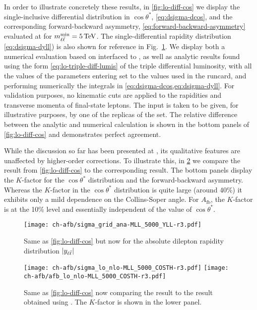 In order to illustrate concretely these results,  
in \cref{fig:lo-diff-cos} we display the
single-inclusive differential distribution in $\cos\theta^*$,
\cref{eq:dsigma-dcos},
and the corresponding forward-backward asymmetry,
\cref{eq:forward-backward-asymmetry} evaluated at \lo
for $\mll^{\text{min}}=\SI{5}{\TeV}$. The single-differential rapidity
distribution \cref{eq:dsigma-dyll}) is also shown for reference in Fig.~\ref{fig:lo-diff-yll}.
%
We display both a numerical evaluation based on \mgamc interfaced to \pineappl,
as well as analytic results found using the form \cref{eq:lo-triple-diff-lumis}
of the triple differential luminosity, with all the values of the parameters
entering  set to the values used in the \mgamc
runcard, and performing  numerically the integrals in
\cref{eq:dsigma-dcos,eq:dsigma-dyll}.
%
For validation purposes, no kinematic cuts are applied to the rapidities and
transverse momenta of final-state leptons.
The \pdf input is taken to be given, for illustrative purposes, by one of the
replicas of the  \nnlo set.
The relative difference between the analytic and numerical calculation is shown
in the bottom panels of \cref{fig:lo-diff-cos} and demonstrates perfect
agreement. 

While the discussion so far has been presented  at \lo, its qualitative
features are unaffected by  higher-order corrections.
%
To illustrate this, in \cref{fig:lo-kfact} we compare the \lo result  from
\cref{fig:lo-diff-cos} to the corresponding \nlo \qcd result.
%
The bottom panels display the \nlo $K$-factor for the $\cos\theta^*$
distribution and the forward-backward asymmetry.
%
Whereas the \nlo $K$-factor in the $\cos\theta^*$ distribution is quite large
(around 40\%) it exhibits only a mild dependence on the Collins-Soper angle.
%
For $A_{\text{fb}}$, the $K$-factor is at the 10\% level and essentially
independent of the value of $\cos\theta^*$.

\begin{figure}[t]
  \centering
  \texttt{[image: ch-afb/sigma\_grid\_ana-MLL\_5000\_YLL-r3.pdf]}
  \caption{Same as \cref{fig:lo-diff-cos} but now for the absolute dilepton rapidity distribution $|y_{\ell\bar{\ell}}|$}
  \label{fig:lo-diff-yll}
\end{figure}
 
\begin{figure}[t]
  \centering
  \texttt{[image: ch-afb/sigma\_lo\_nlo-MLL\_5000\_COSTH-r3.pdf]}
  \texttt{[image: ch-afb/afb\_lo\_nlo-MLL\_5000\_COSTH-r3.pdf]}
  \caption{Same as \cref{fig:lo-diff-cos} now comparing the \lo result
    to the \nlo \qcd result obtained using \mgamc.
    The $K$-factor is shown in the lower panel.
  }
  \label{fig:lo-kfact}
\end{figure}
